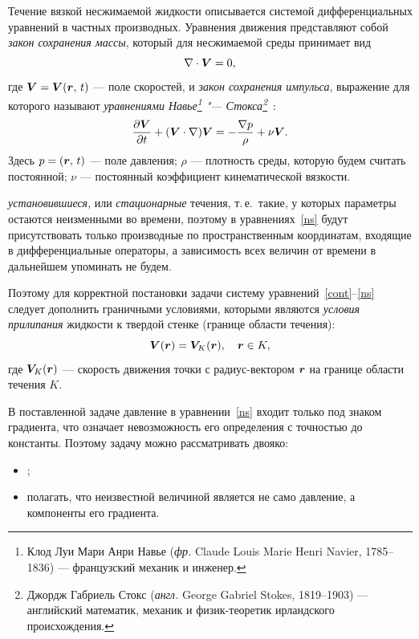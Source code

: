 \documentclass[12pt, a4paper]{article}
\renewcommand{\vec}[1]{\bi{#1}}
\begin{document}
Течение вязкой несжимаемой жидкости описывается системой дифференциальных уравнений в частных производных. Уравнения движения представляют собой \emph{закон сохранения массы}, который для несжимаемой среды принимает вид
\begin{equation}
 \label{cont}
 \nabla\cdot\vec V = 0,
\end{equation}
где $\vec V = \vec V(\vec r,\, t)$ --- поле скоростей, и \emph{закон сохранения импульса}, выражение для которого называют \emph{уравнениями Навье\footnote{Клод Луи Мари Анри Навье (\textit{фр.} Claude Louis Marie Henri Navier, 1785--1836) --- французский механик и инженер.} "--- Стокса\footnote{Джордж Габриель Стокс (\textit{англ.} George Gabriel Stokes, 1819--1903) --- английский математик, механик и физик-теоретик ирландского происхождения.}}~\cite{Loyts}:
\begin{equation}
 \label{ns}
 \frac {\partial \vec V}{\partial t} + (\vec V\cdot\nabla)\vec V = -\frac{\nabla p}{\rho}+\nu\Delta\vec V.
\end{equation}
Здесь $p = (\vec r,\, t) $ --- поле давления; $\rho$ --- плотность среды, которую будем считать постоянной; $\nu$ --- постоянный коэффициент кинематической вязкости.

 \emph{установившиеся}, или \emph{стационарные} течения, т.\,е.\ такие, у которых параметры остаются неизменными во времени, поэтому в уравнениях~\eqref{ns} будут присутствовать только производные по пространственным координатам, входящие в дифференциальные операторы, а зависимость всех величин от времени в дальнейшем упоминать не будем.

Поэтому для корректной постановки задачи систему уравнений~\eqref{cont}--\eqref{ns} следует дополнить граничными условиями, которыми являются \emph{условия прилипания} жидкости к твердой стенке (границе области течения):
\begin{equation}
 \vec V (\vec r)= \vec{V_\mi{K}}(\vec r), \quad \vec r \in K,
\end{equation}
где $\vec{V_\mi{K}}(\vec r)$ --- скорость движения точки с радиус-вектором $\vec r$ на границе области течения $K$.

В поставленной задаче давление в уравнении~\eqref{ns} входит только под знаком градиента, что означает невозможность его определения с точностью до константы. Поэтому задачу можно рассматривать двояко:
\begin{itemize}
\item {};
\item полагать, что неизвестной величиной является не само давление, а компоненты его градиента.
\end{itemize}
\end{document}
